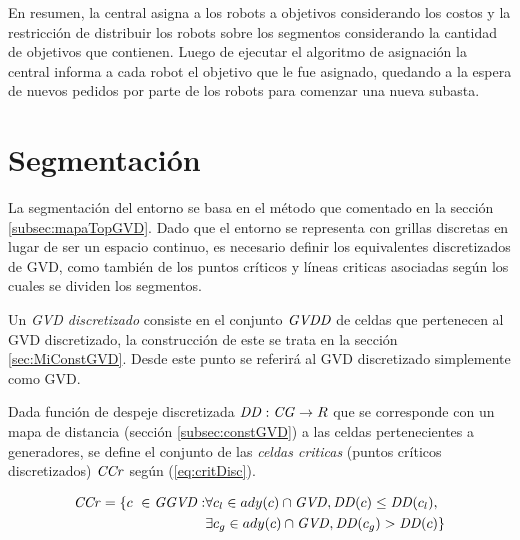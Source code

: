 
En resumen, la central asigna a los robots a objetivos considerando los costos
y la restricción de distribuir los robots sobre los segmentos considerando la
cantidad de objetivos que contienen. Luego de ejecutar el algoritmo de
asignación la central informa a cada robot el objetivo que le fue asignado,
quedando a la espera de nuevos pedidos por parte de los robots para comenzar
una nueva subasta. 

\section{Segmentación}\label{subsec:mapaTopGVDGrid}

La segmentación del entorno se basa en el método que comentado en la sección
\ref{subsec:mapaTopGVD}. Dado que el entorno se representa con grillas
discretas en lugar de ser un espacio continuo, es necesario definir los
equivalentes discretizados de GVD, como también de los puntos críticos y líneas
criticas asociadas según los cuales se dividen los segmentos.

Un \emph{GVD discretizado} consiste en el conjunto $\mathit{GVDD}$ de celdas que
pertenecen al GVD discretizado, la construcción de este se trata en la sección
\ref{sec:MiConstGVD}. Desde este punto se referirá al GVD discretizado
simplemente como GVD.

Dada función de despeje discretizada $\mathit{DD} : \mathit{CG} \rightarrow R$ que se
corresponde con un mapa de distancia (sección \ref{subsec:constGVD}) a las
celdas pertenecientes a generadores, se define el conjunto de las \emph{celdas
criticas} (puntos críticos discretizados) $\mathit{CCr}$ según
(\ref{eq:critDisc}). 

\begin{equation}
\begin{split}
  \mli{CCr} = \{c\ \in \mli{GGVD} : & \forall c_l \in ady(c) \cap \mli{GVD}, \mli{DD}(c) \leq \mli{DD}(c_l),\\
                                    & \exists c_g \in ady(c) \cap \mli{GVD}, \mli{DD}(c_g) > \mli{DD}(c) \} %
\end{split}
\label{eq:critDisc}
\end{equation}

